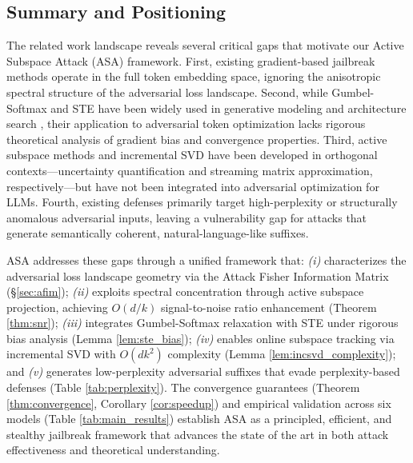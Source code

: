 \documentclass[preprint,12pt]{elsarticle}
\begin{document}
\subsection{Summary and Positioning}
\label{sec:rw_positioning}

The related work landscape reveals several critical gaps that motivate our Active Subspace Attack (ASA) framework. First, existing gradient-based jailbreak methods \cite{zou2023universal, jia2024improved} operate in the full token embedding space, ignoring the anisotropic spectral structure of the adversarial loss landscape. Second, while Gumbel-Softmax and STE have been widely used in generative modeling and architecture search \cite{jang2017categorical, bengio2013estimating}, their application to adversarial token optimization lacks rigorous theoretical analysis of gradient bias and convergence properties. Third, active subspace methods \cite{constantine2014active} and incremental SVD \cite{brand2002incremental} have been developed in orthogonal contexts---uncertainty quantification and streaming matrix approximation, respectively---but have not been integrated into adversarial optimization for LLMs. Fourth, existing defenses \cite{robey2023smoothllm, xie2024gradsafe} primarily target high-perplexity or structurally anomalous adversarial inputs, leaving a vulnerability gap for attacks that generate semantically coherent, natural-language-like suffixes.

ASA addresses these gaps through a unified framework that: \textit{(i)} characterizes the adversarial loss landscape geometry via the Attack Fisher Information Matrix (\S\ref{sec:afim}); \textit{(ii)} exploits spectral concentration through active subspace projection, achieving $O(d/k)$ signal-to-noise ratio enhancement (Theorem \ref{thm:snr}); \textit{(iii)} integrates Gumbel-Softmax relaxation with STE under rigorous bias analysis (Lemma \ref{lem:ste_bias}); \textit{(iv)} enables online subspace tracking via incremental SVD with $O(dk^2)$ complexity (Lemma \ref{lem:incsvd_complexity}); and \textit{(v)} generates low-perplexity adversarial suffixes that evade perplexity-based defenses (Table \ref{tab:perplexity}). The convergence guarantees (Theorem \ref{thm:convergence}, Corollary \ref{cor:speedup}) and empirical validation across six models (Table \ref{tab:main_results}) establish ASA as a principled, efficient, and stealthy jailbreak framework that advances the state of the art in both attack effectiveness and theoretical understanding.


\end{document}
